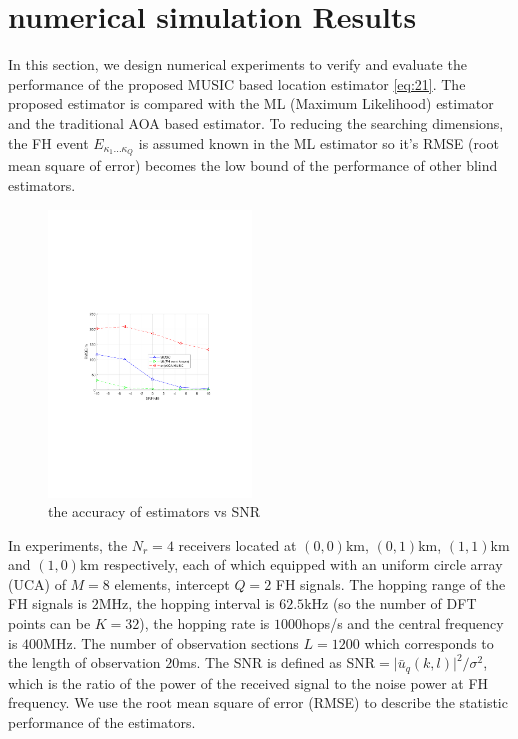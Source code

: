 \documentclass[journal,10pt]{IEEEtran}
\begin{document}
\section{numerical simulation Results}
\label{sec:experiment}
In this section, we design numerical experiments to verify and evaluate the performance of the proposed MUSIC based location estimator \eqref{eq:21}. 
The proposed estimator is compared with the ML (Maximum Likelihood) estimator and the traditional AOA based estimator.  
To reducing the searching dimensions, the FH event $E_{\kappa_1\dots\kappa_Q}$ is assumed known in the ML estimator so it's RMSE (root mean square of error) becomes the low bound of the performance of other blind estimators.




\begin{figure}[!t] 
    \centerline{\includegraphics[width=0.48\textwidth]{figures/simu_vsSNR.pdf}}
	\caption{the accuracy of estimators vs SNR}\label{fig:1}
\end{figure}


In experiments, the $N_r=4$ receivers located at $(0,0)$km, $(0,1)$km, $(1,1)$km and $(1,0)$km respectively, each of which equipped with an uniform circle array (UCA) of $M=8$ elements, intercept $Q=2$ FH signals. 
The hopping range of the FH signals is $2$MHz, the hopping interval is $62.5$kHz (so the number of DFT points can be $K=32$), the hopping rate is $1000$hops/s and the central frequency is $400$MHz. 
The number of observation sections $L=1200$ which corresponds to the length of observation $20$ms.
The SNR is defined as SNR$=\vert\bar{u}_q(k,l)\vert^2/\sigma^2$, which is the ratio of the power of the received signal to the noise power at FH frequency. 
We use the root mean square of error (RMSE) to describe the statistic performance of the estimators.
\end{document}
